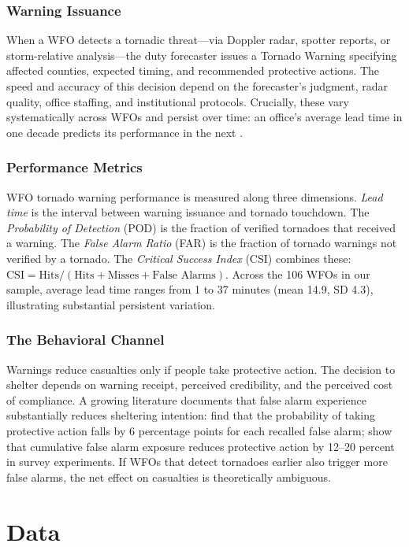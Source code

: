 \documentclass[12pt]{article}
\begin{document}
\subsubsection*{Warning Issuance} When a WFO detects a tornadic threat---via Doppler radar, spotter reports, or storm-relative analysis---the duty forecaster issues a Tornado Warning specifying affected counties, expected timing, and recommended protective actions. The speed and accuracy of this decision depend on the forecaster's judgment, radar quality, office staffing, and institutional protocols. Crucially, these vary systematically across WFOs and persist over time: an office's average lead time in one decade predicts its performance in the next \citep{brotzge2013}.

\subsubsection*{Performance Metrics} WFO tornado warning performance is measured along three dimensions. \textit{Lead time} is the interval between warning issuance and tornado touchdown. The \textit{Probability of Detection} (POD) is the fraction of verified tornadoes that received a warning. The \textit{False Alarm Ratio} (FAR) is the fraction of tornado warnings not verified by a tornado. The \textit{Critical Success Index} (CSI) combines these: $\text{CSI} = \text{Hits} / (\text{Hits} + \text{Misses} + \text{False Alarms})$. Across the 106 WFOs in our sample, average lead time ranges from 1 to 37 minutes (mean 14.9, SD 4.3), illustrating substantial persistent variation.

\subsubsection*{The Behavioral Channel} Warnings reduce casualties only if people take protective action. The decision to shelter depends on warning receipt, perceived credibility, and the perceived cost of compliance. A growing literature documents that false alarm experience substantially reduces sheltering intention: \citet{simmons2009} find that the probability of taking protective action falls by 6 percentage points for each recalled false alarm; \citet{ripberger2015} show that cumulative false alarm exposure reduces protective action by 12--20 percent in survey experiments. If WFOs that detect tornadoes earlier also trigger more false alarms, the net effect on casualties is theoretically ambiguous.


\section{Data}
\end{document}
